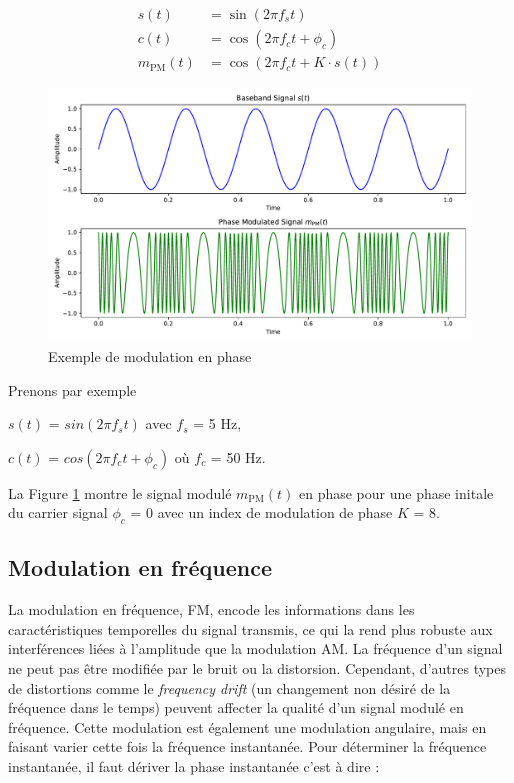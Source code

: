 \begin{align}
    s(t) &= \sin(2\pi f_{s}t) \\
    c(t) &= \cos(2\pi f_{c}t + \phi_{c}) \\
    m_\mathrm{PM}(t) &= \cos\left(2\pi f_{c}t + K \cdot s(t)\right)
\end{align}

\begin{figure}[h]
\centering

\includegraphics[scale=0.5]{images/PM_MOD.pdf}
\caption{Exemple de modulation en phase}\label{term3}
\end{figure}

Prenons par exemple

\vspace{0.1cm}

$s(t)$ = $sin(2\pi f_{s}t)$ avec $f_{s}$ = 5 Hz,

$c(t)$ = $cos(2\pi f_{c}t + \phi_{c})$ où $f_{c}$ = 50 Hz.

\vspace{0.1cm}

La Figure \ref{term3} montre le signal modulé $m_\mathrm{PM}(t)$ en phase pour une phase initale du carrier signal $\phi_{c}$ = 0 avec un index de modulation de phase $K$ = 8.




\subsection{Modulation en fréquence}

La modulation en fréquence, \ac{FM}, encode les informations dans les caractéristiques temporelles du signal transmis, ce qui la rend plus robuste aux interférences liées à l'amplitude que la modulation AM. La fréquence d'un signal ne peut pas être modifiée par le bruit ou la distorsion. Cependant, d'autres types de distortions comme le \textit{frequency drift} (un changement non désiré de la fréquence dans le temps) peuvent affecter la qualité d'un signal modulé en fréquence. Cette modulation est également une modulation angulaire, mais en faisant varier cette fois la fréquence instantanée. Pour déterminer la fréquence instantanée, il faut dériver la phase instantanée c'est à dire :

